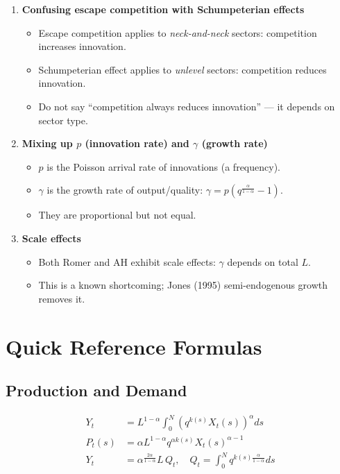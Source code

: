 \documentclass[a4paper,11pt]{article}
\begin{document}
\begin{enumerate}
    \item \textbf{Confusing escape competition with Schumpeterian effects}
    \begin{itemize}
        \item Escape competition applies to \emph{neck-and-neck} sectors: competition increases innovation.
        \item Schumpeterian effect applies to \emph{unlevel} sectors: competition reduces innovation.
        \item Do not say ``competition always reduces innovation'' --- it depends on sector type.
    \end{itemize}

    \item \textbf{Mixing up $p$ (innovation rate) and $\gamma$ (growth rate)}
    \begin{itemize}
        \item $p$ is the Poisson arrival rate of innovations (a frequency).
        \item $\gamma$ is the growth rate of output/quality: $\gamma = p(q^{\frac{\alpha}{1-\alpha}} - 1)$.
        \item They are proportional but not equal.
    \end{itemize}

    \item \textbf{Scale effects}
    \begin{itemize}
        \item Both Romer and AH exhibit scale effects: $\gamma$ depends on total $L$.
        \item This is a known shortcoming; Jones (1995) semi-endogenous growth removes it.
    \end{itemize}
\end{enumerate}

\clearpage

\section{Quick Reference Formulas}

\subsection*{Production and Demand}
\begin{align*}
Y_t &= L^{1-\alpha}\int_0^N (q^{k(s)} X_t(s))^\alpha ds \tag{Final Good}\\
P_t(s) &= \alpha L^{1-\alpha} q^{\alpha k(s)} X_t(s)^{\alpha-1} \tag{Intermediate Demand}\\
Y_t &= \alpha^{\frac{2\alpha}{1-\alpha}} L\, Q_t, \quad Q_t = \int_0^N q^{k(s)\frac{\alpha}{1-\alpha}}ds \tag{Aggregate Output}
\end{align*}
\end{document}
